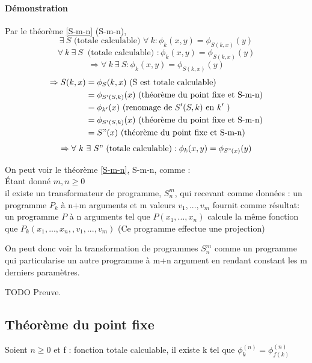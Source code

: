 \paragraph{Démonstration}
	Par le théorème \ref{S-m-n} (S-m-n),
	\[ \exists \ S \text{ (totale calculable) } \forall \ k : \phi_k(x,y)=\phi_{S(k,x)}(y)\]
	\[ \forall \ k \ \exists \ S \ \text{ (totale calculable) } : \phi_k(x,y)=\phi_{S(k,x)}(y)\]
	\[ \Rightarrow \forall \ k \ \exists \ S : \phi_k(x,y) =\phi_{S(k,x)}(y) \]
	\begin{align}
		\Rightarrow S(k,x) &= \phi_{S}(k,x) \text{ (S est totale calculable)}\\
		&= \phi_{S'(S,k)}(x) \text{ (théorème du point fixe et S-m-n)}\\
		&= \phi_{k'}(x) \text{ (renomage de } S'(S,k) \text{ en } k' \text{ )}\\
		&= \phi_{S'(S,k)}(x) \text{ (théorème du point fixe et S-m-n)}\\
		&= S"(x)\text{ (théorème du point fixe et S-m-n)}
	\end{align}
	\[ \Rightarrow \forall \ k \ \exists \ S" \ \text{(totale calculable)} :
       	\phi_k(x,y)=\phi_{S"(x)}(y)\]

\begin{myrem}
	On peut voir le théorème \ref{S-m-n}, S-m-n, comme : \\
	Étant donné $m,n \geq 0$\\
	il existe un transformateur de programme, $S^m_n$, qui recevant comme 
	données : un programme $P_k$ à n+m arguments et m valeurs $v_1,...,v_m$
	fournit comme résultat: un programme $P$ à n arguments tel que 
	$P(x_1,...,x_n)$ calcule la même fonction que 
	$P_k(x_1,...,x_n,,v_1,...,v_m)$ (Ce programme effectue une projection)
\end{myrem}

\begin{myrem}
	On peut donc voir la transformation de programmes $S^m_n$ comme un 
	programme qui particularise un autre programme à m+n argument en rendant 
	constant les m derniers paramètres.
\end{myrem}
TODO Preuve.

\subsection{Théorème du point fixe}
\label{sub:th_or_me_du_point_fixe}
\begin{mytheo} 
	\label{point-fixe}Soient $n \geq 0$ et f : fonction totale 
	calculable, il existe k tel que $\phi^{(n)}_k = \phi^{(n)}_{f(k)}$  
\end{mytheo}

